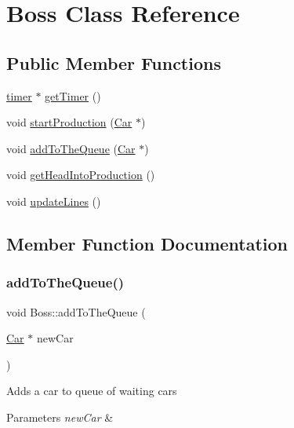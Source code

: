 \hypertarget{class_boss}{}\section{Boss Class Reference}
\label{class_boss}
\subsection*{Public Member Functions}
\begin{DoxyCompactItemize}
\item 
\mbox{\hyperlink{classtimer}{timer}} $\ast$ \mbox{\hyperlink{class_boss_a95c7ec846f41a2739929afee235f21c8}{get\+Timer}} ()
\item 
void \mbox{\hyperlink{class_boss_a9db6a91b8ddacb6258923352a8fb2d8e}{start\+Production}} (\mbox{\hyperlink{class_car}{Car}} $\ast$)
\item 
void \mbox{\hyperlink{class_boss_ac507d93e21fb29ad8c621988ed8e98e7}{add\+To\+The\+Queue}} (\mbox{\hyperlink{class_car}{Car}} $\ast$)
\item 
void \mbox{\hyperlink{class_boss_a923846754239842186339c9c9ab531e0}{get\+Head\+Into\+Production}} ()
\item 
void \mbox{\hyperlink{class_boss_a6b221d96706333ee2fe5a2562d6fa94e}{update\+Lines}} ()
\end{DoxyCompactItemize}


\subsection{Member Function Documentation}
\mbox{\label{class_boss_ac507d93e21fb29ad8c621988ed8e98e7}} 
\subsubsection{\texorpdfstring{addToTheQueue()}{addToTheQueue()}}
{\footnotesize\ttfamily void Boss\+::add\+To\+The\+Queue (\begin{DoxyParamCaption}\item[{\mbox{\hyperlink{class_car}{Car}} $\ast$}]{new\+Car }\end{DoxyParamCaption})}

Adds a car to queue of waiting cars 
\begin{DoxyParams}{Parameters}
{\em new\+Car} & \\
\hline
\end{DoxyParams}
\mbox{\label{class_boss_a923846754239842186339c9c9ab531e0}} 

